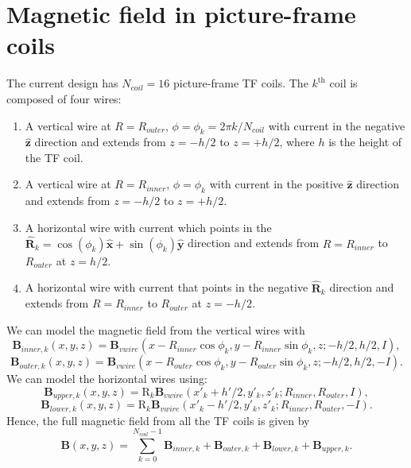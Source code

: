 \documentclass{article}
\begin{document}
\section{Magnetic field in picture-frame coils}

The current design has $N_{coil}=16$ picture-frame TF coils. The $k^{\text{th}}$ coil is composed of four wires:
\begin{enumerate}
    \item A vertical wire at $R=R_{outer}$, $\phi=\phi_k=2\pi k/N_{coil}$ with current in the negative $\mathbf{\hat{z}}$ direction and extends from $z=-h/2$ to $z=+h/2$, where $h$ is the height of the TF coil.
    \item  A vertical wire at $R=R_{inner}$, $\phi=\phi_k$ with current in the positive $\mathbf{\hat{z}}$ direction and extends from $z=-h/2$ to $z=+h/2$.
    \item A horizontal wire with current which points in the $\mathbf{\hat{R}}_k = \cos(\phi_k)\mathbf{\hat{x}}+\sin(\phi_k)\mathbf{\hat{y}}$ direction and extends from $R=R_{inner}$ to $R_{outer}$ at $z=h/2$.
    \item A horizontal wire with current that points in the negative $\mathbf{\hat{R}}_k$ direction and extends from $R=R_{inner}$ to $R_{outer}$ at $z=-h/2$.
\end{enumerate}
We can model the magnetic field from the vertical wires with 
\[\mathbf{B}_{inner,k}(x,y,z) = \mathbf{B}_{vwire}(x-R_{inner}\cos\phi_k, y-R_{inner}\sin{\phi_k}, z; -h/2, h/2, I),\]
\[\mathbf{B}_{outer,k}(x,y,z) = \mathbf{B}_{vwire}(x-R_{outer}\cos\phi_k, y-R_{outer}\sin{\phi_k}, z; -h/2, h/2, -I).\]
We can model the horizontal wires using:
\[\mathbf{B}_{upper,k}(x,y,z) = \text{R}_k\mathbf{B}_{vwire}(x'_k + h'/2, y'_k, z'_k; R_{inner}, R_{outer}, I),\]
\[\mathbf{B}_{lower,k}(x,y,z) = \text{R}_k\mathbf{B}_{vwire}(x'_k - h'/2, y'_k, z'_k; R_{inner}, R_{outer}, -I).\]
Hence, the full magnetic field from all the TF coils is given by
\[\boxed{\mathbf{B}(x, y, z) = \sum_{k=0}^{N_{coil}-1}\mathbf{B}_{inner,k} + \mathbf{B}_{outer,k} + \mathbf{B}_{lower,k} + \mathbf{B}_{upper,k}.}\]
\end{document}
